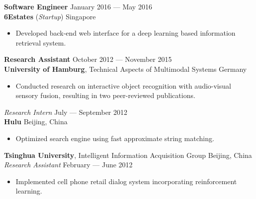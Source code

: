 \documentclass[a4paper,9pt]{extarticle} %
\begin{document}

\iffalse{}

\textbf{Software Engineer} \hfill January 2016 --- May 2016 \\
\textbf{6Estates} (\textit{Startup})  \hfill Singapore \\
\vspace{-1.5\parskip}

\begin{itemize}[nosep]
  \item Developed back-end web interface for a deep learning based information retrieval system.
\end{itemize}


\textbf{Research Assistant} \hfill October 2012 --- November 2015 \\
\textbf{University of Hamburg}, Technical Aspects of Multimodal Systems \hfill Germany \\
\vspace{-1.5\parskip}

\begin{itemize}[nosep]
  \item Conducted research on interactive object recognition with audio-visual sensory fusion, resulting in two peer-reviewed publications.
\end{itemize}


\textit{Research Intern} \hfill July --- September 2012 \\
\textbf{Hulu} \hfill Beijing, China \\
\vspace{-1.5\parskip}

\begin{itemize}[nosep]
  \item Optimized search engine using fast approximate string matching.
\end{itemize}


\textbf{Tsinghua University}, Intelligent Information Acquisition Group \hfill Beijing, China \\
\textit{Research Assistant} \hfill February --- June 2012
\vspace{-\parskip}
\begin{itemize}
  \item Implemented cell phone retail dialog system incorporating reinforcement learning.
\end{itemize}
\end{document}
